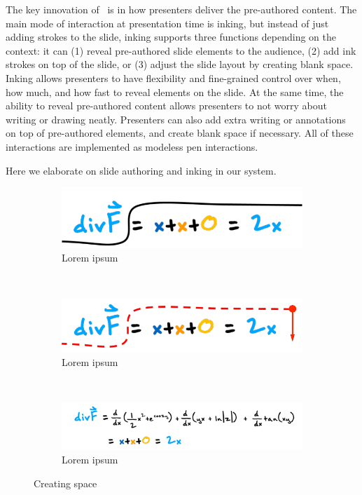 The key innovation of \interface\ is in how presenters deliver the pre-authored content.  The main mode of interaction at presentation time is inking, but instead of just adding strokes to the slide, inking supports three functions depending on the context: it can (1) reveal pre-authored slide elements to the audience, (2) add ink strokes on top of the slide, or (3) adjust the slide layout by creating blank space. Inking allows presenters to have flexibility and fine-grained control over when, how much, and how fast to reveal elements on the slide.
%
At the same time, the ability to reveal pre-authored content allows presenters to not worry about writing or drawing neatly.
%
Presenters can also add extra writing or annotations on top of pre-authored elements, and create blank space if necessary. 
%
All of these interactions are implemented as modeless pen interactions.

Here we elaborate on slide authoring and inking in our system.

\begin{figure}[t!]
    \centering
    \begin{subfigure}[t]{0.48\columnwidth}
        \centering
        \includegraphics[width=1\columnwidth]{figures/create_space1}
        \caption{Lorem ipsum}
    \end{subfigure}%
    ~ 
    \begin{subfigure}[t]{0.48\columnwidth}
        \centering
        \includegraphics[width=1\columnwidth]{figures/create_space2}
        \caption{Lorem ipsum}
    \end{subfigure}
    ~
        \begin{subfigure}[t]{1\columnwidth}
        \centering
        \includegraphics[width=1\columnwidth]{figures/create_space3}
        \caption{Lorem ipsum}
    \end{subfigure}  
    \caption{Creating space}
\end{figure}



